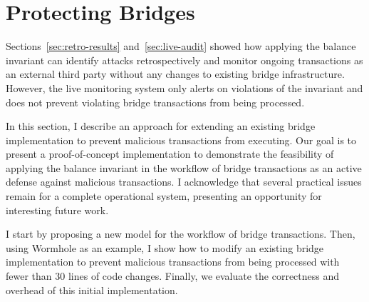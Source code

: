 \section{Protecting Bridges}
\label{sec:active-protect}

Sections~\ref{sec:retro-results} and~\ref{sec:live-audit} showed how
applying the balance invariant can identify attacks retrospectively and
monitor ongoing transactions as an external third party without any
changes to existing bridge infrastructure.  However, the live
monitoring system only alerts on violations of the invariant and does
not prevent violating bridge transactions from being processed.

In this section, I describe an approach for extending an existing
bridge implementation to prevent malicious transactions from
executing.  Our goal is to present a proof-of-concept implementation
to demonstrate the feasibility of applying the balance invariant in the
workflow of bridge transactions as an active defense against malicious
transactions.  I acknowledge that several practical issues remain
for a complete operational system, presenting an opportunity for
interesting future work.




I start by proposing a new model for the workflow of bridge
transactions.  Then, using Wormhole as an example, I show how to
modify an existing bridge implementation to prevent malicious transactions from
being processed with fewer than 30 lines of code changes.  Finally, we
evaluate the correctness and overhead of this initial implementation.

